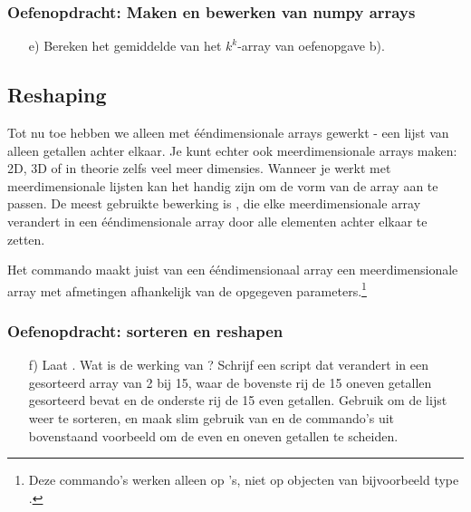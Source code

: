 \documentclass[a4paper,11pt, fleqn]{article}
\begin{document}

\subsubsection*{Oefenopdracht: Maken en bewerken van numpy arrays}
\begin{itemize}
	\item[e)] Bereken het gemiddelde van het $k^k$-array van oefenopgave b).
\end{itemize}

\iffalse
\subsection{Reshaping}
Tot nu toe hebben we alleen met \'e\'endimensionale arrays gewerkt - een lijst van alleen getallen achter elkaar. Je kunt echter ook meerdimensionale arrays maken: 2D, 3D of in theorie zelfs veel meer dimensies. Wanneer je werkt met meerdimensionale lijsten kan het handig zijn om de vorm van de array aan te passen. De meest gebruikte bewerking is , die elke meerdimensionale array verandert in een \'e\'endimensionale array door alle elementen achter elkaar te zetten.

Het commando  maakt juist van een \'e\'endimensionaal array een meerdimensionale array met afmetingen afhankelijk van de opgegeven parameters.\footnote{Deze commando's werken alleen op 's, niet op objecten van bijvoorbeeld type .}


\subsubsection*{Oefenopdracht: sorteren en reshapen}
\begin{itemize}
	\item[f)] Laat . Wat is de werking van ? Schrijf een script dat  verandert in een gesorteerd array van 2 bij 15, waar de bovenste rij de 15 oneven getallen gesorteerd bevat en de onderste rij de 15 even getallen. Gebruik  om de lijst weer te sorteren, en maak slim gebruik van  en de commando's uit bovenstaand voorbeeld om de even en oneven getallen te scheiden.
\end{itemize}
\end{document}
